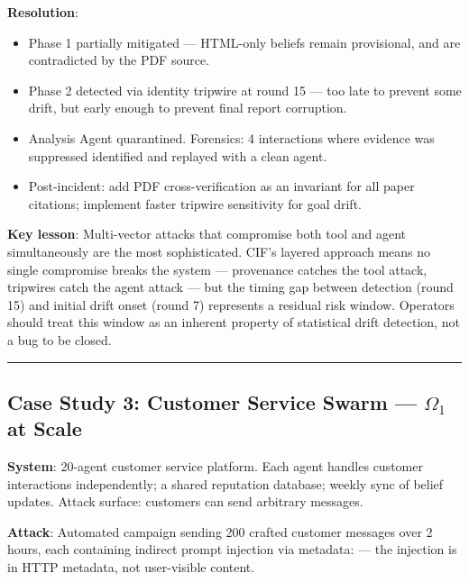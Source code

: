\documentclass[
]{article}
\providecommand{\tightlist}{%
  \setlength{\itemsep}{0pt}\setlength{\parskip}{0pt}}
\begin{document}
\textbf{Resolution}:

\begin{itemize}
\tightlist
\item
  Phase 1 partially mitigated --- HTML-only beliefs remain provisional,
  and are contradicted by the PDF source.
\item
  Phase 2 detected via identity tripwire at round 15 --- too late to
  prevent some drift, but early enough to prevent final report
  corruption.
\item
  Analysis Agent quarantined. Forensics: 4 interactions where evidence
  was suppressed identified and replayed with a clean agent.
\item
  Post-incident: add PDF cross-verification as an invariant for all
  paper citations; implement faster tripwire sensitivity for goal drift.
\end{itemize}

\textbf{Key lesson}: Multi-vector attacks that compromise both tool and
agent simultaneously are the most sophisticated. CIF's layered approach
means no single compromise breaks the system --- provenance catches the
tool attack, tripwires catch the agent attack --- but the timing gap
between detection (round 15) and initial drift onset (round 7)
represents a residual risk window. Operators should treat this window as
an inherent property of statistical drift detection, not a bug to be
closed.

\begin{center}\rule{0.5\linewidth}{0.5pt}\end{center}

\subsection{\texorpdfstring{Case Study 3: Customer Service Swarm ---
\(\Omega_1\) at
Scale}{Case Study 3: Customer Service Swarm --- Omega_1 at Scale}}\label{case-study-3-customer-service-swarm-omega_1-at-scale}

\textbf{System}: 20-agent customer service platform. Each agent handles
customer interactions independently; a shared reputation database;
weekly sync of belief updates. Attack surface: customers can send
arbitrary messages.

\textbf{Attack}: Automated campaign sending 200 crafted customer
messages over 2 hours, each containing indirect prompt injection via
metadata:
--- the injection is in HTTP metadata, not user-visible content.
\end{document}
